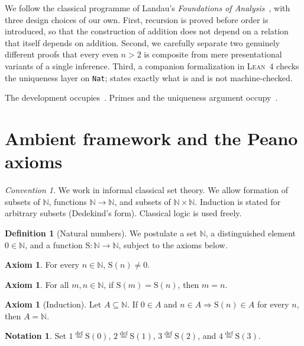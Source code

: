 \documentclass[11pt,reqno]{amsart}
\theoremstyle{plain}
\theoremstyle{definition}
\newtheorem{definition}[theorem]{Definition}
\newtheorem{axiom}[theorem]{Axiom}
\newtheorem{notation}[theorem]{Notation}
\theoremstyle{remark}
\newtheorem*{convention}{Convention}
\newcommand{\N}{\mathbb{N}}
\newcommand{\Suc}{\mathrm{S}}
\newcommand{\eqdef}{\stackrel{\mathrm{def}}{=}}
\numberwithin{equation}{section}
\begin{document}
We follow the classical programme of Landau's \emph{Foundations of
Analysis}~\cite{Landau1951}, with three design choices of our own.
First, recursion is proved before order is introduced, so that the
construction of addition does not depend on a relation that itself
depends on addition. Second, we carefully separate two genuinely
different proofs that every even \(n>2\) is composite from mere
presentational variants of a single inference. Third, a companion
formalization in \textsc{Lean}~4 checks the uniqueness layer on
\texttt{Nat};  states exactly what is and is not
machine-checked.

The development occupies~.
Primes and the uniqueness argument occupy~.

\section{Ambient framework and the Peano axioms}
\label{sec:peano}

\begin{convention}
We work in informal classical set theory. We allow formation of
subsets of \(\N\), functions \(\N\to\N\), and subsets of
\(\N\times\N\). Induction is stated for arbitrary subsets (Dedekind's
form). Classical logic is used freely.
\end{convention}

\begin{definition}[Natural numbers]
\label{def:N}
We postulate a set \(\N\), a distinguished element \(0\in\N\), and a
function \(\Suc\colon\N\to\N\), subject to the axioms below.
\end{definition}

\begin{axiom}
\label{ax:peano1}
For every \(n\in\N\), \(\Suc(n)\neq 0\).
\end{axiom}

\begin{axiom}
\label{ax:peano2}
For all \(m,n\in\N\), if \(\Suc(m)=\Suc(n)\), then \(m=n\).
\end{axiom}

\begin{axiom}[Induction]
\label{ax:peano3}
Let \(A\subseteq\N\). If \(0\in A\) and \(n\in A\Rightarrow\Suc(n)\in A\)
for every \(n\), then \(A=\N\).
\end{axiom}

\begin{notation}
Set \(1\eqdef\Suc(0)\), \(2\eqdef\Suc(1)\), \(3\eqdef\Suc(2)\), and
\(4\eqdef\Suc(3)\).
\end{notation}
\end{document}
